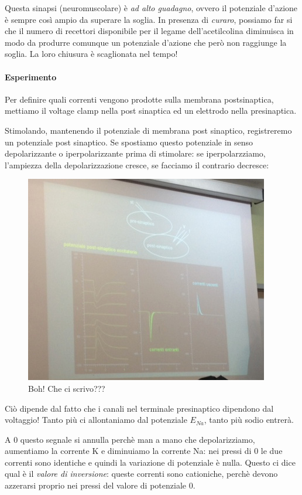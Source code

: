 \documentclass[a4paper,12pt]{article}
\begin{document}
Questa sinapsi (neuromuscolare) è \emph{ad alto guadagno}, ovvero il potenziale d'azione è sempre così ampio da superare la soglia. In presenza di \emph{curaro}, possiamo far si che il numero di recettori disponibile per il legame dell'acetilcolina diminuisca in modo da produrre comunque un potenziale d'azione che però non raggiunge la soglia. La loro chiusura è scaglionata nel tempo!

\paragraph{Esperimento}
Per definire quali correnti vengono prodotte sulla membrana postsinaptica, mettiamo il voltage clamp nella post sinaptica ed un elettrodo nella presinaptica.

Stimolando, mantenendo il potenziale di membrana post sinaptico, registreremo un potenziale post sinaptico. Se spostiamo questo potenziale in senso depolarizzante o iperpolarizzante prima di stimolare: se iperpolarzziamo, l'ampiezza della depolarizzazione cresce, se facciamo il contrario decresce:

\begin{figure}[H]
\centering
\includegraphics[scale=0.6]{immagine/esperimento.jpg}
\caption{Boh! Che ci scrivo???} 
\end{figure}

Ciò dipende dal fatto che i canali nel terminale presinaptico dipendono dal voltaggio! Tanto più ci allontaniamo dal potenziale $E_{Na}$, tanto più sodio entrerà.

A 0 questo segnale si annulla perchè man a mano che depolarizziamo, aumentiamo la corrente K e diminuiamo la corrente Na: nei pressi di 0 le due correnti sono identiche e quindi la variazione di potenziale è nulla. Questo ci dice qual è il \emph{valore di inversione}: queste correnti sono cationiche, perchè devono azzerarsi proprio nei pressi del valore di potenziale 0.
\end{document}
